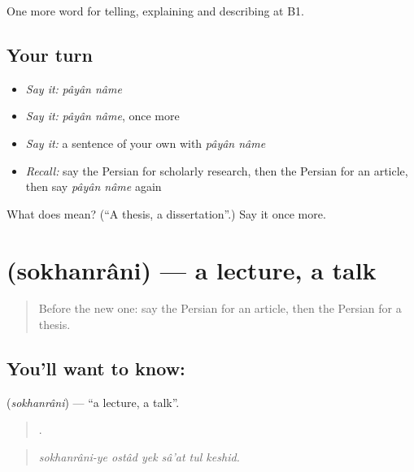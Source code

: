 \begin{grammarlens}[title={What you've built}]
One more word for telling, explaining and describing at B1.
\end{grammarlens}

\subsection*{Your turn}
\begin{itemize}
\raggedright
  \item \emph{Say it:} \emph{pâyân nâme}
  \item \emph{Say it:} \emph{pâyân nâme}, once more
  \item \emph{Say it:} a sentence of your own with \emph{pâyân nâme}
  \item \emph{Recall:} say the Persian for scholarly research, then the Persian for an article, then say \emph{pâyân nâme} again
\end{itemize}

\begin{tcolorbox}[breakable,colback=teal!4,colframe=teal!35!black,title={Before you move on}]
What does   mean? (\textquotedblleft{}A thesis, a dissertation\textquotedblright{}.) Say it once more.
\end{tcolorbox}
\section[\texorpdfstring{\fa{سخنرانی} (sokhanrâni)}{سخنرانی (sokhanrâni)}]{ (sokhanrâni) — a lecture, a talk}

\label{lesson:FA-C402-sokhanrani}



\begin{quote}
Before the new one: say the Persian for an article, then the Persian for a thesis.
\end{quote}

\subsection*{You'll want to know: }
\textbf{} (\emph{sokhanrâni}) — \textquotedblleft{}a lecture, a talk\textquotedblright{}.

\begin{quote}
     .
\end{quote}

\begin{quote}
\emph{sokhanrâni-ye ostâd yek sâ'at tul keshid.}
\end{quote}

